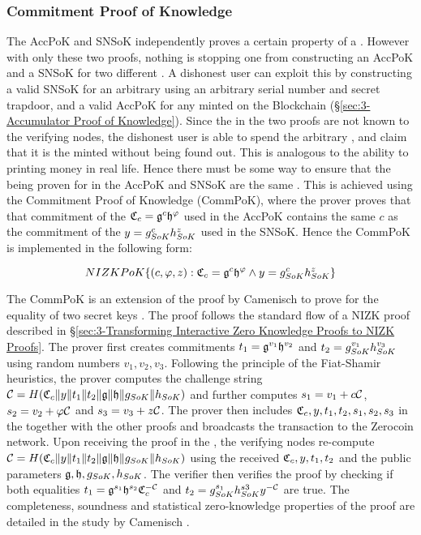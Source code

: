\subsubsection{Commitment Proof of Knowledge}
\label{sec:3-Commitment Proof of Knowledge}
The AccPoK and SNSoK independently proves a certain property of a \kwCoin{}. However with only these two proofs, nothing is stopping one from constructing an AccPoK and a SNSoK for two different . A dishonest user can exploit this by constructing a valid SNSoK for an arbitrary \kwCoin{} using an arbitrary serial number and secret trapdoor, and a valid AccPoK for any minted \kwCoin{} on the Blockchain (\S\ref{sec:3-Accumulator Proof of Knowledge}). Since the  in the two proofs are not known to the verifying nodes, the dishonest user is able to spend the arbitrary \kwCoin{}, and claim that it is the minted \kwCoin{} without being found out. This is analogous to the ability to printing money in real life. Hence there must be some way to ensure that the  being proven for in the AccPoK and SNSoK are the same \kwCoin{}. This is achieved using the Commitment Proof of Knowledge (CommPoK), where the prover proves that that commitment of the \kwCoin{} $\mathfrak{C}_c=\mathfrak{g}^{c}\mathfrak{h}^{\varphi}$ used in the AccPoK contains the same $c$ as the commitment of the \kwCoin{} $y=g_{SoK}^{c}h_{SoK}^{z}$ used in the SNSoK. Hence the CommPoK is implemented in the following form:

$$NIZKPoK\{(c,\varphi,z):\mathfrak{C}_c=\mathfrak{g}^{c}\mathfrak{h}^{\varphi} \wedge y=g_{SoK}^{c}h_{SoK}^{z}\}$$

The CommPoK is an extension of the proof by Camenisch to prove for the equality of two secret keys \cite{No1998}. The proof follows the standard flow of a NIZK proof described in \S\ref{sec:3-Transforming Interactive Zero Knowledge Proofs to NIZK Proofs}. The prover first creates commitments $t_1=\mathfrak{g}^{v_1}\mathfrak{h}^{v_2}$ and $t_2=g_{SoK}^{v_1}h_{SoK}^{v_3}$ using random numbers $v_1,v_2,v_3$. Following the principle of the Fiat-Shamir heuristics, the prover computes the challenge string $\mathcal{C}=H(\mathfrak{C}_c \| y \| t_1 \| t_2 \| \mathfrak{g} \| \mathfrak{h} \| g_{SoK} \| h_{SoK})$ and further computes $s_1=v_1+c\mathcal{C}$, $s_2=v_2+\varphi\mathcal{C}$ and $s_3=v_3+z\mathcal{C}$. The prover then includes $\mathfrak{C}_c,y,t_1,t_2,s_1,s_2,s_3$ in the  together with the other proofs and broadcasts the transaction to the Zerocoin network. Upon receiving the proof in the , the verifying nodes re-compute $\mathcal{C}=H(\mathfrak{C}_c \| y \| t_1 \| t_2 \| \mathfrak{g} \| \mathfrak{h} \| g_{SoK} \| h_{SoK})$ using the received $\mathfrak{C}_c,y,t_1,t_2$ and the public parameters $\mathfrak{g},\mathfrak{h},g_{SoK},h_{SoK}$. The verifier then verifies the proof by checking if both equalities $t_1=\mathfrak{g}^{s_1}\mathfrak{h}^{s_2}\mathfrak{C}_c^{-\mathcal{C}}$ and $t_2=g_{SoK}^{s_1}h_{SoK}^{s3}y^{-\mathcal{C}}$ are true. The completeness, soundness and statistical zero-knowledge properties of the proof are detailed in the study by Camenisch \cite{No1998}.

